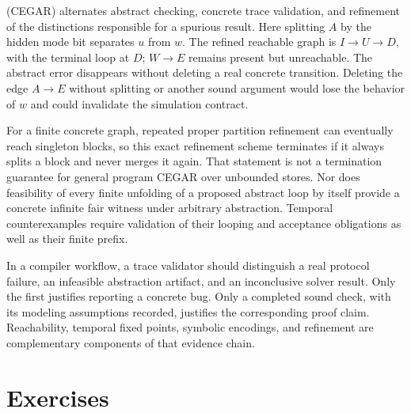  (CEGAR) alternates abstract checking, concrete trace validation, and refinement of the distinctions responsible for a spurious result.
Here splitting $A$ by the hidden mode bit separates $u$ from $w$.
The refined reachable graph is $I\to U\to D$, with the terminal loop at $D$; $W\to E$ remains present but unreachable.
The abstract error disappears without deleting a real concrete transition.
Deleting the edge $A\to E$ without splitting or another sound argument would lose the behavior of $w$ and could invalidate the simulation contract.

For a finite concrete graph, repeated proper partition refinement can eventually reach singleton blocks, so this exact refinement scheme terminates if it always splits a block and never merges it again.
That statement is not a termination guarantee for general program CEGAR over unbounded stores.
Nor does feasibility of every finite unfolding of a proposed abstract loop by itself provide a concrete infinite fair witness under arbitrary abstraction.
Temporal counterexamples require validation of their looping and acceptance obligations as well as their finite prefix.

In a compiler workflow, a trace validator should distinguish a real protocol failure, an infeasible abstraction artifact, and an inconclusive solver result.
Only the first justifies reporting a concrete bug.
Only a completed sound check, with its modeling assumptions recorded, justifies the corresponding proof claim.
Reachability, temporal fixed points, symbolic encodings, and refinement are complementary components of that evidence chain.

\section{Exercises}
\label{sec:ch46-exercises}


